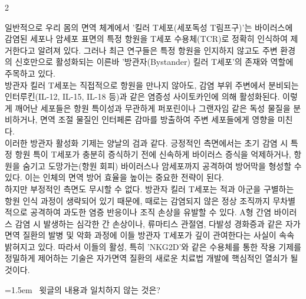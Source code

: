 \documentclass[10pt, a4paper]{article}
\begin{document}
\begin{multicols}{2}
\begin{passagebox}
\noindent{}일반적으로 우리 몸의 면역 체계에서 '킬러 T세포(세포독성 T림프구)'는 바이러스에 감염된 세포나 암세포 표면의 특정 항원을 T세포 수용체(TCR)로 정확히 인식하여 제거한다고 알려져 있다. 그러나 최근 연구들은 특정 항원을 인지하지 않고도 주변 환경의 신호만으로 활성화되는 이른바 '방관자(Bystander) 킬러 T세포'의 존재와 역할에 주목하고 있다.
\\[0.5em]
방관자 킬러 T세포는 직접적으로 항원을 만나지 않아도, 감염 부위 주변에서 분비되는 인터루킨(IL-12, IL-15, IL-18 등)과 같은 염증성 사이토카인에 의해 활성화된다. 이렇게 깨어난 세포들은 항원 특이성과 무관하게 퍼포린이나 그랜자임 같은 독성 물질을 분비하거나, 면역 조절 물질인 인터페론 감마를 방출하여 주변 세포들에게 영향을 미친다.
\\[0.5em]
이러한 방관자 활성화 기제는 양날의 검과 같다. 긍정적인 측면에서는 초기 감염 시 특정 항원 특이 T세포가 충분히 증식하기 전에 신속하게 바이러스 증식을 억제하거나, 항원을 숨기고 도망가는(항원 회피) 바이러스나 암세포까지 공격하여 방어막을 형성할 수 있다. 이는 인체의 면역 방어 효율을 높이는 중요한 전략이 된다.
\\[0.5em]
하지만 부정적인 측면도 무시할 수 없다. 방관자 킬러 T세포는 적과 아군을 구별하는 항원 인식 과정이 생략되어 있기 때문에, 때로는 감염되지 않은 정상 조직까지 무차별적으로 공격하여 과도한 염증 반응이나 조직 손상을 유발할 수 있다. A형 간염 바이러스 감염 시 발생하는 심각한 간 손상이나, 류마티스 관절염, 다발성 경화증과 같은 자가면역 질환의 발병 및 악화 과정에 이들 방관자 T세포가 깊이 관여한다는 사실이 속속 밝혀지고 있다. 따라서 이들의 활성, 특히 'NKG2D'와 같은 수용체를 통한 작용 기제를 정밀하게 제어하는 기술은 자가면역 질환의 새로운 치료법 개발에 핵심적인 열쇠가 될 것이다.
\end{passagebox}
\vspace{1mm}

\noindent\begin{minipage}{\columnwidth}
\vspace{2mm}
{\hangindent=1.5em  ~윗글의 내용과 일치하지 않는 것은?\par}


\end{minipage}
\end{multicols}
\end{document}
